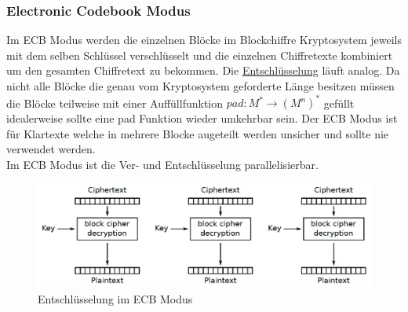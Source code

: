\documentclass[a4paper,12pt]{article}
\begin{document}
\subsubsection{Electronic Codebook Modus}
Im ECB Modus werden die einzelnen Blöcke im Blockchiffre Kryptosystem jeweils mit dem selben Schlüssel verschlüsselt und die einzelnen Chiffretexte kombiniert um den gesamten Chiffretext zu bekommen. Die \hyperref[pic:ECBModus]{Entschlüsselung} läuft analog.
Da nicht alle Blöcke die genau vom Kryptosystem geforderte Länge besitzen müssen die Blöcke teilweise mit einer Auffüllfunktion $pad: M^*\rightarrow (M^n)^*$ gefüllt idealerweise sollte eine pad Funktion wieder umkehrbar sein.
Der ECB Modus ist für Klartexte welche in mehrere Blocke augeteilt werden unsicher und sollte nie verwendet werden.\\
Im ECB Modus ist die Ver- und Entschlüsselung parallelisierbar.

\begin{figure}
\centering
\includegraphics[scale=0.5]{Grafiken/ECBModus.png}
\caption{Entschlüsselung im ECB Modus}
\label{pic:ECBModus}
\end{figure}
\end{document}
